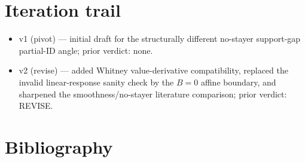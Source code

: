 \documentclass[11pt]{article}
\theoremstyle{definition}
\theoremstyle{plain}
\theoremstyle{remark}
\begin{document}
\section{Iteration trail}
\begin{itemize}[leftmargin=*]
\item v1 (pivot) --- initial draft for the structurally different no-stayer support-gap partial-ID angle; prior verdict: none.
\item v2 (revise) --- added Whitney value-derivative compatibility, replaced the invalid linear-response sanity check by the \(B=0\) affine boundary, and sharpened the smoothness/no-stayer literature comparison; prior verdict: REVISE.
\end{itemize}

\section*{Bibliography}
\end{document}
